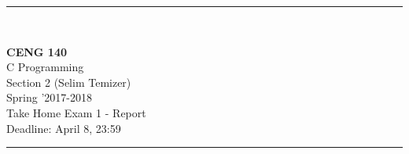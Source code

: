 \documentclass[12pt]{article}
\newcommand{\HRule}{\rule{\linewidth}{1mm}}
\begin{document}
\noindent
\HRule \\[3mm]
\begin{flushright}

                                         \LARGE \textbf{CENG 140}  \\[4mm]
                                         \Large C Programming \\[4mm]
                                        \normalsize Section 2 (Selim Temizer)\\
                                        \normalsize      Spring '2017-2018 \\
                                           \Large   Take Home Exam 1 - Report \\
                    \normalsize Deadline: April 8, 23:59 \\
                   
\end{flushright}
\HRule
\end{document}

